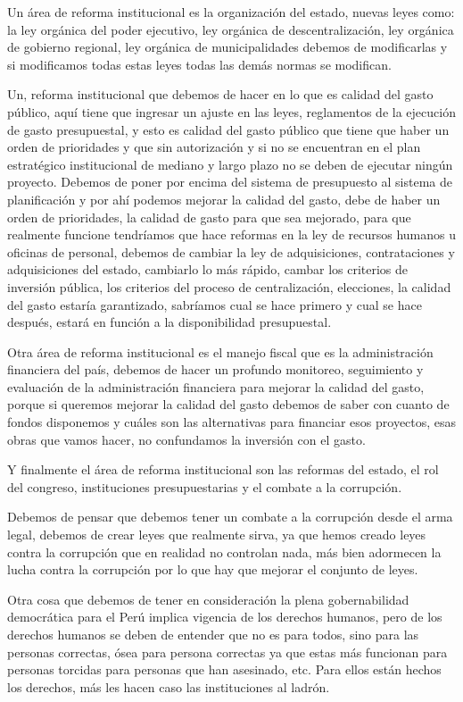 \documentclass[
  jou,
  floatsintext,
  longtable,
  a4paper,
  nolmodern,
  notxfonts,
  notimes,
  12pt,
  colorlinks=true,linkcolor=blue,citecolor=blue,urlcolor=blue]{apa7}
\begin{document}
Un área de reforma institucional es la organización del estado, nuevas
leyes como: la ley orgánica del poder ejecutivo, ley orgánica de
descentralización, ley orgánica de gobierno regional, ley orgánica de
municipalidades debemos de modificarlas y si modificamos todas estas
leyes todas las demás normas se modifican.

Un, reforma institucional que debemos de hacer en lo que es calidad del
gasto público, aquí tiene que ingresar un ajuste en las leyes,
reglamentos de la ejecución de gasto presupuestal, y esto es calidad del
gasto público que tiene que haber un orden de prioridades y que sin
autorización y si no se encuentran en el plan estratégico institucional
de mediano y largo plazo no se deben de ejecutar ningún proyecto.
Debemos de poner por encima del sistema de presupuesto al sistema de
planificación y por ahí podemos mejorar la calidad del gasto, debe de
haber un orden de prioridades, la calidad de gasto para que sea
mejorado, para que realmente funcione tendríamos que hace reformas en la
ley de recursos humanos u oficinas de personal, debemos de cambiar la
ley de adquisiciones, contrataciones y adquisiciones del estado,
cambiarlo lo más rápido, cambar los criterios de inversión pública, los
criterios del proceso de centralización, elecciones, la calidad del
gasto estaría garantizado, sabríamos cual se hace primero y cual se hace
después, estará en función a la disponibilidad presupuestal.

Otra área de reforma institucional es el manejo fiscal que es la
administración financiera del país, debemos de hacer un profundo
monitoreo, seguimiento y evaluación de la administración financiera para
mejorar la calidad del gasto, porque si queremos mejorar la calidad del
gasto debemos de saber con cuanto de fondos disponemos y cuáles son las
alternativas para financiar esos proyectos, esas obras que vamos hacer,
no confundamos la inversión con el gasto.

Y finalmente el área de reforma institucional son las reformas del
estado, el rol del congreso, instituciones presupuestarias y el combate
a la corrupción.

Debemos de pensar que debemos tener un combate a la corrupción desde el
arma legal, debemos de crear leyes que realmente sirva, ya que hemos
creado leyes contra la corrupción que en realidad no controlan nada, más
bien adormecen la lucha contra la corrupción por lo que hay que mejorar
el conjunto de leyes.

Otra cosa que debemos de tener en consideración la plena gobernabilidad
democrática para el Perú implica vigencia de los derechos humanos, pero
de los derechos humanos se deben de entender que no es para todos, sino
para las personas correctas, ósea para persona correctas ya que estas
más funcionan para personas torcidas para personas que han asesinado,
etc. Para ellos están hechos los derechos, más les hacen caso las
instituciones al ladrón.
\end{document}
